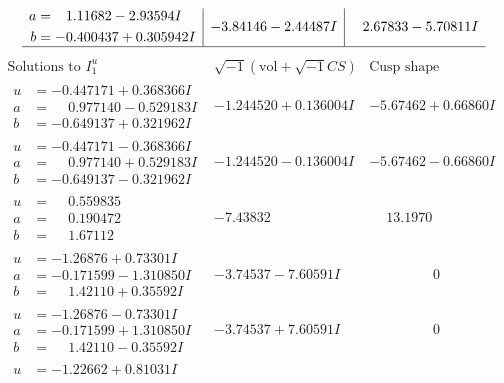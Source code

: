 \documentclass[1p]{elsarticle_modified}
\theoremstyle{definition}
\newcommand{\I}{\sqrt{-1}}
\begin{document}
$$\begin{array}{c|c|c}
\begin{aligned}
a &= \phantom{-}1.11682 - 2.93594 I \\
b &= -0.400437 + 0.305942 I\end{aligned}
 & -3.84146 - 2.44487 I & \phantom{-}2.67833 - 5.70811 I\\
 \hline 
 \end{array}$$\newpage$$\begin{array}{c|c|c}  
\text{Solutions to }I^u_{1}& \I (\text{vol} + \sqrt{-1}CS) & \text{Cusp shape}\\
 \hline 
\begin{aligned}
u &= -0.447171 + 0.368366 I \\
a &= \phantom{-}0.977140 - 0.529183 I \\
b &= -0.649137 + 0.321962 I\end{aligned}
 & -1.244520 + 0.136004 I & -5.67462 + 0.66860 I \\ \hline\begin{aligned}
u &= -0.447171 - 0.368366 I \\
a &= \phantom{-}0.977140 + 0.529183 I \\
b &= -0.649137 - 0.321962 I\end{aligned}
 & -1.244520 - 0.136004 I & -5.67462 - 0.66860 I \\ \hline\begin{aligned}
u &= \phantom{-}0.559835\phantom{ +0.000000I} \\
a &= \phantom{-}0.190472\phantom{ +0.000000I} \\
b &= \phantom{-}1.67112\phantom{ +0.000000I}\end{aligned}
 & -7.43832\phantom{ +0.000000I} & \phantom{-}13.1970\phantom{ +0.000000I} \\ \hline\begin{aligned}
u &= -1.26876 + 0.73301 I \\
a &= -0.171599 - 1.310850 I \\
b &= \phantom{-}1.42110 + 0.35592 I\end{aligned}
 & -3.74537 - 7.60591 I & \phantom{-0.000000 } 0 \\ \hline\begin{aligned}
u &= -1.26876 - 0.73301 I \\
a &= -0.171599 + 1.310850 I \\
b &= \phantom{-}1.42110 - 0.35592 I\end{aligned}
 & -3.74537 + 7.60591 I & \phantom{-0.000000 } 0 \\ \hline\begin{aligned}
u &= -1.22662 + 0.81031 I \\

\end{aligned}
\end{array}$$
\end{document}
